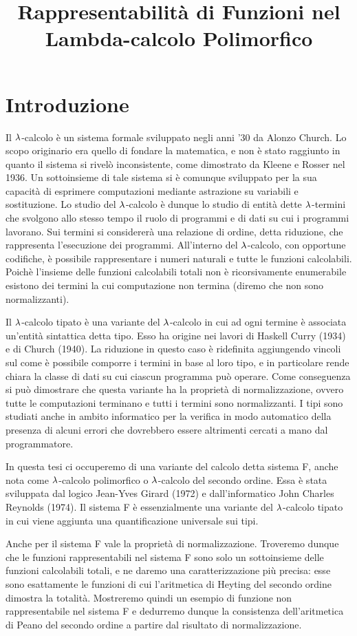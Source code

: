 \documentclass[]{marticle}
\title{\textbf{\huge Rappresentabilit\`a di Funzioni nel Lambda-calcolo
Polimorfico}}
\date{}
\begin{document}
\tableofcontents
\newpage

\section{Introduzione}

Il $\lambda$-calcolo \`e un sistema formale sviluppato negli anni '30 da Alonzo
Church. Lo scopo originario era quello di fondare la matematica, e non \`e stato
raggiunto in quanto il sistema si rivel\`o inconsistente, come dimostrato da
Kleene e Rosser nel 1936. Un sottoinsieme di tale sistema si \`e comunque
sviluppato per la sua capacit\`a di esprimere computazioni mediante astrazione
su variabili e sostituzione. Lo studio del $\lambda$-calcolo \`e dunque lo studio di
entit\`a dette $\lambda$-termini che svolgono allo stesso tempo il ruolo di programmi
e di dati su cui i programmi lavorano. Sui termini si considerer\`a una
relazione di ordine, detta riduzione, che rappresenta l'esecuzione dei
programmi. All'interno del $\lambda$-calcolo, con opportune codifiche, \`e possibile
rappresentare i numeri naturali e tutte le funzioni calcolabili. Poich\`e
l'insieme delle funzioni calcolabili totali non \`e ricorsivamente enumerabile
esistono dei termini la cui computazione non termina (diremo che non sono
normalizzanti).

Il $\lambda$-calcolo tipato \`e una variante del $\lambda$-calcolo in cui ad ogni termine
\`e associata un'entit\`a sintattica detta tipo. Esso ha origine nei lavori di
Haskell Curry (1934) e di Church (1940).  La riduzione in questo caso \`e
ridefinita aggiungendo vincoli sul come \`e possibile comporre i termini in base
al loro tipo, e in particolare rende chiara la classe di dati su cui ciascun
programma pu\`o operare.  Come conseguenza si pu\`o dimostrare che questa
variante ha la propriet\`a di normalizzazione, ovvero tutte le computazioni
terminano e tutti i termini sono normalizzanti. I tipi sono studiati anche in
ambito informatico per la verifica in modo automatico della presenza di alcuni
errori che dovrebbero essere altrimenti cercati a mano dal programmatore.

In questa tesi ci occuperemo di una variante del calcolo detta sistema F, anche
nota come $\lambda$-calcolo polimorfico o $\lambda$-calcolo del secondo ordine. Essa \`e
stata sviluppata dal logico Jean-Yves Girard (1972) e dall'informatico John
Charles Reynolds (1974). Il sistema F \`e essenzialmente una variante del
$\lambda$-calcolo tipato in cui viene aggiunta una quantificazione universale sui
tipi.

Anche per il sistema F vale la propriet\`a di normalizzazione. Troveremo dunque
che le funzioni rappresentabili nel sistema F sono solo un sottoinsieme delle
funzioni calcolabili totali, e ne daremo una caratterizzazione pi\`u precisa:
esse sono esattamente le funzioni di cui l'aritmetica di Heyting del secondo
ordine dimostra la totalit\`a.  Mostreremo quindi un esempio di funzione non
rappresentabile nel sistema F e dedurremo dunque la consistenza dell'aritmetica
di Peano del secondo ordine a partire dal risultato di normalizzazione.
\end{document}
